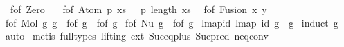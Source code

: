 \begin{isabellebody}
\isanewline
\ \ {\isachardoublequoteopen}f{\isacharunderscore}{\kern0pt}of\ Zero\ {\isacharequal}{\kern0pt}\ {\isacharbraceleft}{\kern0pt}{\isacharhash}{\kern0pt}{\isacharbraceright}{\kern0pt}{\isachardoublequoteclose}\isanewline
{\isacharbar}{\kern0pt}\ {\isachardoublequoteopen}f{\isacharunderscore}{\kern0pt}of\ {\isacharparenleft}{\kern0pt}Atom\ p\ xs{\isacharparenright}{\kern0pt}\ {\isacharequal}{\kern0pt}\ {\isacharbraceleft}{\kern0pt}{\isacharhash}{\kern0pt}\ {\isacharparenleft}{\kern0pt}p{\isacharcomma}{\kern0pt}\ length\ xs{\isacharparenright}{\kern0pt}\ {\isacharhash}{\kern0pt}{\isacharbraceright}{\kern0pt}{\isachardoublequoteclose}\isanewline
{\isacharbar}{\kern0pt}\ {\isachardoublequoteopen}f{\isacharunderscore}{\kern0pt}of\ {\isacharparenleft}{\kern0pt}Fusion\ x\ y{\isacharparenright}{\kern0pt}\ {\isacharequal}{\kern0pt}\ {\isacharbraceleft}{\kern0pt}{\isacharhash}{\kern0pt}{\isacharbraceright}{\kern0pt}{\isachardoublequoteclose}\isanewline
{\isacharbar}{\kern0pt}\ {\isachardoublequoteopen}f{\isacharunderscore}{\kern0pt}of\ {\isacharparenleft}{\kern0pt}Mol\ g{}\ g{}{\isacharparenright}{\kern0pt}\ {\isacharequal}{\kern0pt}\ f{\isacharunderscore}{\kern0pt}of\ g{}\ {\isacharplus}{\kern0pt}\ f{\isacharunderscore}{\kern0pt}of\ g{}{\isachardoublequoteclose}\isanewline
{\isacharbar}{\kern0pt}\ {\isachardoublequoteopen}f{\isacharunderscore}{\kern0pt}of\ {\isacharparenleft}{\kern0pt}Nu\ g{\isacharparenright}{\kern0pt}\ {\isacharequal}{\kern0pt}\ f{\isacharunderscore}{\kern0pt}of\ g{\isachardoublequoteclose}\isanewline
\isanewline
\isanewline
\isanewline
{}\isamarkupfalse%
\ lmap{\isacharunderscore}{\kern0pt}id{\isacharcolon}{\kern0pt}\ {\isachardoublequoteopen}lmap\ id\ g\ {\isacharequal}{\kern0pt}\ g{\isachardoublequoteclose}\isanewline
%
\isadelimproof
%
\endisadelimproof
%
\isatagproof
{}\isamarkupfalse%
\ {\isacharparenleft}{\kern0pt}induct\ g{\isacharparenright}{\kern0pt}\isanewline
{}\isamarkupfalse%
\ auto\isanewline
{}\isamarkupfalse%
\ {\isacharparenleft}{\kern0pt}metis\ {\isacharparenleft}{\kern0pt}full{\isacharunderscore}{\kern0pt}types{\isacharcomma}{\kern0pt}\ lifting{\isacharparenright}{\kern0pt}\ ext\ Suc{\isacharunderscore}{\kern0pt}eq{\isacharunderscore}{\kern0pt}plus{}\ Suc{\isacharunderscore}{\kern0pt}pred{\isacharprime}{\kern0pt}\ neq{}{\isacharunderscore}{\kern0pt}conv{\isacharparenright}{\kern0pt}%
\endisatagproof
{\isafoldproof}%
%
\isadelimproof
\isanewline
%
\endisadelimproof

\end{isabellebody}
